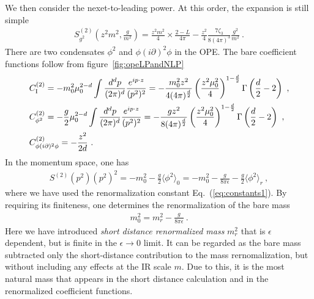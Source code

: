 \documentclass[a4paper,11pt]{article}
\begin{document}
We then consider the nexet-to-leading power. At this order, the expansion is still simple
\begin{align}
S_{g^2}^{(2)}\left(z^2m^2,\frac{g}{m^2}\right)=\frac{z^2m^2}{4} \times \frac{2-L}{4\pi} -\frac{z^2}{4}\frac{7\zeta_3}{8(4\pi)^3}\frac{g^2}{m^2} \ .
\end{align}
There are two condensates $\phi^2$ and $\phi (i\partial)^2\phi$ in the OPE. The bare coefficient functions follow from figure~\ref{fig:opeLPandNLP}
\begin{align}
& C_{\rm I}^{(2)}=-m_0^2\mu_0^{2-d}\int\frac{d^dp}{(2\pi)^d}\frac{e^{ip\cdot z}}{(p^2)^2}=- \frac{m_0^2z^2}{4(4\pi)^{\frac{d}{2}}}\left(\frac{z^2\mu_0^2}{4}\right)^{1-\frac{d}{2}}\Gamma \left(\frac{d}{2}-2\right)\ , \\ 
& C_{\phi^2}^{(2)}=-\frac{g}{2}\mu_0^{2-d}\int\frac{d^dp}{(2\pi)^d}\frac{e^{ip\cdot z}}{(p^2)^2}= - \frac{gz^2}{8(4\pi)^{\frac{d}{2}}}\left(\frac{z^2\mu_0^2}{4}\right)^{1-\frac{d}{2}}\Gamma \left(\frac{d}{2}-2\right)\ , \\
& C_{\phi(i\partial)^2\phi}^{(2)}=-\frac{z^2}{2d} \ .
\end{align}
In the momentum space, one has 
\begin{align}
S^{(2)}(p^2)(p^2)^2=-m_0^2-\frac{g}{2}\langle\phi^2 \rangle_0=-m_0^2-\frac{g}{8\pi \epsilon}-\frac{g}{2}\langle\phi^2\rangle_r \ ,
\end{align}
where we have used the renormalization constant Eq.~(\ref{eq:constants1}). By requiring its finiteness, one determines the renormalization of the bare mass 
\begin{align}
m_0^2=m_r^2-\frac{g}{8\pi \epsilon} \ .
\end{align}
Here we have introduced {\it short distance renormalized mass} $m_r^2$ that is $\epsilon$ dependent, but is finite in the $\epsilon \rightarrow 0$ limit. It can be regarded as the bare mass subtracted only the short-distance contribution to the mass rernomalization, but without including any effects at the IR scale $m$.  Due to this, it is the most natural mass that appears in the short distance calculation and in the renormalized coefficient functions.
\end{document}
